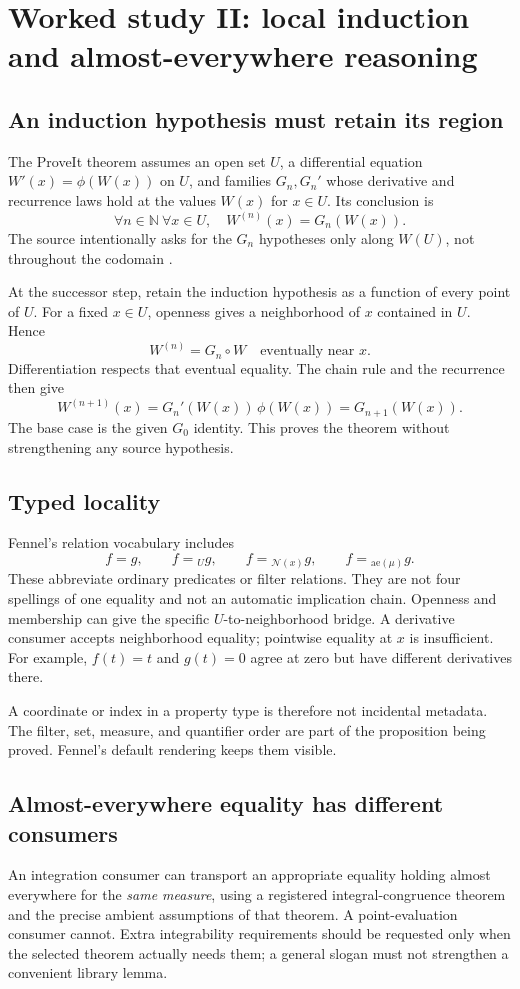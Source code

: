 \documentclass[11pt,a4paper]{article}
\theoremstyle{definition}
\theoremstyle{remark}
\newcommand{\NN}{\mathbb N}
\begin{document}
\section{Worked study II: local induction and almost-everywhere reasoning}
\label{sec:locality}

\subsection{An induction hypothesis must retain its region}
The ProveIt theorem assumes an open set $U$, a differential equation
$W'(x)=\phi(W(x))$ on $U$, and families $G_n,G_n'$ whose derivative and recurrence
laws hold at the values $W(x)$ for $x\in U$. Its conclusion is
\[
 \forall n\in\NN\ \forall x\in U,\quad
 W^{(n)}(x)=G_n(W(x)).
\]
The source intentionally asks for the $G_n$ hypotheses only along $W(U)$,
not throughout the codomain \cite{ode}.

At the successor step, retain the induction hypothesis as a function of every
point of $U$. For a fixed $x\in U$, openness gives a neighborhood of $x$
contained in $U$. Hence
\[
 W^{(n)}=G_n\circ W\quad\text{eventually near }x.
\]
Differentiation respects that eventual equality. The chain rule and the
recurrence then give
\[
 W^{(n+1)}(x)=G_n'(W(x))\,\phi(W(x))=G_{n+1}(W(x)).
\]
The base case is the given $G_0$ identity. This proves the theorem without
strengthening any source hypothesis.

\subsection{Typed locality}
Fennel's relation vocabulary includes
\[
 f=g,\qquad f={}_U g,\qquad
 f={}_{\mathcal N(x)}g,\qquad f={}_{\mathrm{ae}(\mu)}g.
\]
These abbreviate ordinary predicates or filter relations. They are not four
spellings of one equality and not an automatic implication chain. Openness
and membership can give the specific $U$-to-neighborhood bridge. A derivative
consumer accepts neighborhood equality; pointwise equality at $x$ is
insufficient. For example, $f(t)=t$ and $g(t)=0$ agree at zero but have different
derivatives there.

A coordinate or index in a property type is therefore not incidental metadata.
The filter, set, measure, and quantifier order are part of the proposition
being proved. Fennel's default rendering keeps them visible.

\subsection{Almost-everywhere equality has different consumers}
An integration consumer can transport an appropriate equality holding almost
everywhere for the \emph{same measure}, using a registered integral-congruence
theorem and the precise ambient assumptions of that theorem. A point-evaluation
consumer cannot. Extra integrability requirements should be requested only
when the selected theorem actually needs them; a general slogan must not
strengthen a convenient library lemma.
\end{document}
